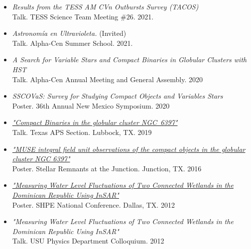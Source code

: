 \documentclass[letterpaper,10pt]{article}
\begin{document}
\begin{itemize}[label=$\blacktriangleright$]


\item \textit{Results from the TESS AM CVn Outbursts Survey (TACOS)} \\ Talk. TESS Science Team Meeting $\#26$. 2021.


\item \textit{Astronom\'ia en Ultravioleta.} (Invited)\\ Talk. Alpha-Cen Summer School. 2021.

\item \textit{A Search for Variable Stars and Compact Binaries in Globular Clusters with HST}\\ Talk. Alpha-Cen Annual Meeting and General Assembly. 2020


\item \textit{SSCOVaS: Survey for Studying Compact Objects and Variables Stars}\\ Poster. 36th Annual New Mexico Symposium. 2020

\item \textit{\href{https://manuelpm.me/TexasAPS2019/}{"Compact Binaries in the globular cluster NGC~6397"}} \\Talk. Texas APS Section. Lubbock, TX. 2019



\item \textit{\href{http://manuelpm.me/papers/MUSEposter.pdf}{"MUSE integral field unit observations of the compact objects in the globular cluster NGC 6397"}} \\Poster. Stellar Remnants at the Junction. Junction, TX. 2016




\item \textit{\href{http://manuelpm.me/papers/posterinsar.pdf}{"Measuring Water Level Fluctuations of Two Connected Wetlands in the Dominican Republic Using InSAR"}} \\Poster. SHPE National Conference. Dallas, TX. 2012

\item \emph{"Measuring Water Level Fluctuations of Two Connected Wetlands in the Dominican Republic Using InSAR"}\\
Talk. USU Physics Department Colloquium. 2012
\end{itemize}
\end{document}
